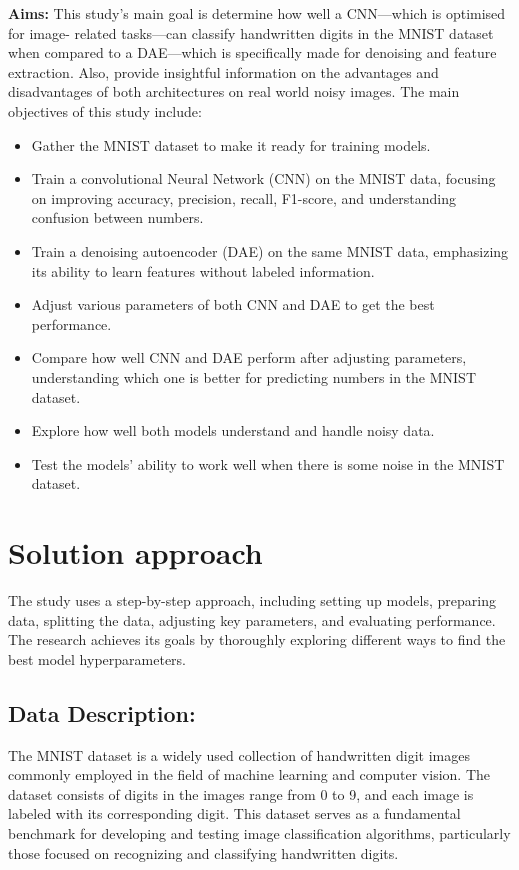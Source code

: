 \textbf{Aims:} This study's main goal is determine how well a CNN—which is optimised for image-
related tasks—can classify handwritten digits in the MNIST dataset when compared to a DAE—which 
is specifically made for denoising and feature extraction. Also, provide insightful information 
on the advantages and disadvantages of both architectures on real world noisy images.
The main objectives of this study include:
\begin{itemize}
    \item Gather the MNIST dataset to make it ready for training models.

    \item Train a convolutional Neural Network (CNN) on the MNIST data, focusing on improving accuracy, precision, recall, F1-score, and understanding confusion between numbers.

    \item Train a denoising autoencoder (DAE) on the same MNIST data, emphasizing its ability to learn features without labeled information.

    \item Adjust various parameters of both CNN and DAE to get the best performance.

    \item Compare how well CNN and DAE perform after adjusting parameters, understanding which one is better for predicting numbers in the MNIST dataset.

    \item Explore how well both models understand and handle noisy data.

    \item Test the models' ability to work well when there is some noise in the MNIST dataset.

\end{itemize}

\section{Solution approach}
The study uses a step-by-step approach, including setting up models, preparing data, splitting the data, adjusting key parameters, and evaluating performance. The research achieves its goals by thoroughly exploring different ways to find the best model hyperparameters.
\label{sec:intro_sol} %
\subsection{Data Description:}
The MNIST dataset \citep{mnistdataset} is a widely used collection of handwritten digit images commonly employed in the field of machine learning and computer vision.  The dataset consists of digits in the images range from 0 to 9, and each image is labeled with its corresponding digit. This dataset serves as a fundamental benchmark for developing and testing image classification algorithms, particularly those focused on recognizing and classifying handwritten digits. 
